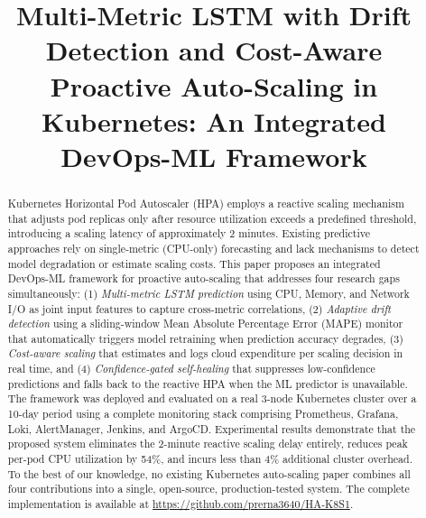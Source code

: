 \documentclass[journal]{IEEEtran}
\begin{document}
\title{Multi-Metric LSTM with Drift Detection and Cost-Aware Proactive Auto-Scaling in Kubernetes: An Integrated DevOps-ML Framework}

\author{
\and
{}
}

\maketitle

\begin{abstract}
Kubernetes Horizontal Pod Autoscaler (HPA) employs a reactive scaling mechanism that adjusts pod replicas only after resource utilization exceeds a predefined threshold, introducing a scaling latency of approximately 2 minutes. Existing predictive approaches rely on single-metric (CPU-only) forecasting and lack mechanisms to detect model degradation or estimate scaling costs. This paper proposes an integrated DevOps-ML framework for proactive auto-scaling that addresses four research gaps simultaneously: (1) \textit{Multi-metric LSTM prediction} using CPU, Memory, and Network I/O as joint input features to capture cross-metric correlations, (2) \textit{Adaptive drift detection} using a sliding-window Mean Absolute Percentage Error (MAPE) monitor that automatically triggers model retraining when prediction accuracy degrades, (3) \textit{Cost-aware scaling} that estimates and logs cloud expenditure per scaling decision in real time, and (4) \textit{Confidence-gated self-healing} that suppresses low-confidence predictions and falls back to the reactive HPA when the ML predictor is unavailable. The framework was deployed and evaluated on a real 3-node Kubernetes cluster over a 10-day period using a complete monitoring stack comprising Prometheus, Grafana, Loki, AlertManager, Jenkins, and ArgoCD. Experimental results demonstrate that the proposed system eliminates the 2-minute reactive scaling delay entirely, reduces peak per-pod CPU utilization by 54\%, and incurs less than 4\% additional cluster overhead. To the best of our knowledge, no existing Kubernetes auto-scaling paper combines all four contributions into a single, open-source, production-tested system. The complete implementation is available at \url{https://github.com/prerna3640/HA-K8S1}.
\end{abstract}
\end{document}
